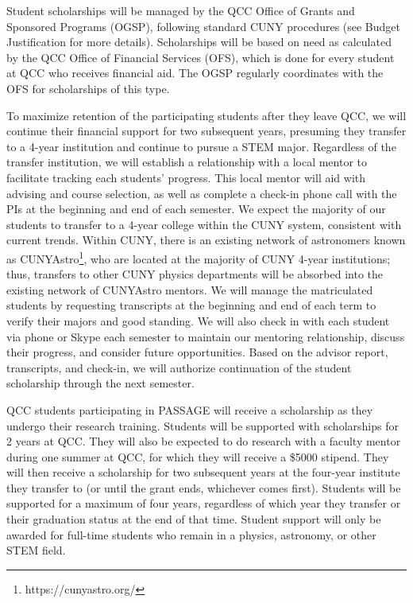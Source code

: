 \documentclass[12pt]{article}
\begin{document}
Student scholarships will be managed by the QCC Office of Grants and Sponsored Programs (OGSP), following standard CUNY procedures (see Budget Justification for more details).  Scholarships will be based on need as calculated by the QCC Office of Financial Services (OFS), which is done for every student at QCC who receives financial aid.  The OGSP regularly coordinates with the OFS for scholarships of this type.  


To maximize retention of the participating students after they leave QCC, we will continue their financial support for two subsequent years, presuming they transfer to a 4-year institution and continue to pursue a STEM  major.  Regardless of the transfer institution, we will establish a relationship with a local mentor to facilitate tracking each students' progress.  This local mentor will aid with advising and course selection, as well as complete a check-in phone call with the PIs at the beginning and end of each semester.  We expect the majority of our students to transfer to a 4-year college within the CUNY system, consistent with current trends.  Within CUNY, there is an existing network of astronomers known as CUNYAstro\footnote{https://cunyastro.org/}, who are located at the majority of CUNY 4-year institutions; thus, transfers to other CUNY physics departments will be absorbed into the existing network of CUNYAstro  mentors.  We will manage the matriculated students by requesting transcripts at the beginning and end of each term to verify their majors and good standing.  We will also check in with each student via phone or Skype each semester to maintain our mentoring relationship, discuss their progress, and consider future opportunities.  Based on the advisor report, transcripts, and check-in, we will authorize continuation of the student scholarship through the next semester.  

QCC students participating in PASSAGE will receive a scholarship as they undergo their research training. Students will be supported with scholarships for 2 years at QCC.  They will also be expected to do research with a faculty mentor during one summer at QCC, for which they will receive a \$5000 stipend.  They will then receive a scholarship for two subsequent years at the four-year institute they transfer to (or until the grant ends, whichever comes first).  Students will be supported for a maximum of four years, regardless of which year they transfer or their graduation status at the end of that time. Student support will only be awarded for full-time students who remain in a physics, astronomy, or other STEM field.  
\end{document}
